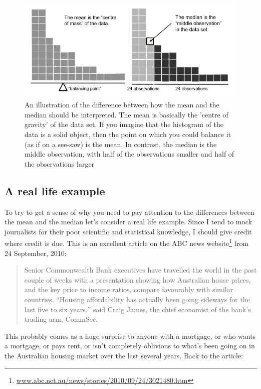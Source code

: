 \documentclass[
]{book}
\begin{document}
\begin{figure}
\includegraphics[width=0.9\linewidth]{images/Figure11} \caption{An illustration of the difference between how the mean and the median should be interpreted. The mean is basically the 'centre of gravity' of the data set. If you imagine that the histogram of the data is a solid object, then the point on which you could balance it (as if on a see-saw) is the mean. In contrast, the median is the middle observation, with half of the observations smaller and half of the observations larger}\label{fig:fig4-4}
\end{figure}

\hypertarget{a-real-life-example}{%
\subsection{A real life example}\label{a-real-life-example}}

To try to get a sense of why you need to pay attention to the differences between the mean and the median let's consider a real life example. Since I tend to mock journalists for their poor scientific and statistical knowledge, I should give credit where credit is due. This is an excellent article on the ABC news website\footnote{\url{www.abc.net.au/news/stories/2010/09/24/3021480.htm}} from 24 September, 2010:

\begin{quote}
Senior Commonwealth Bank executives have travelled the world in the past couple of weeks with a presentation showing how Australian house prices, and the key price to income ratios, compare favourably with similar countries. ``Housing affordability has actually been going sideways for the last five to six years,'' said Craig James, the chief economist of the bank's trading arm, CommSec.
\end{quote}

This probably comes as a huge surprise to anyone with a mortgage, or who wants a mortgage, or pays rent, or isn't completely oblivious to what's been going on in the Australian housing market over the last several years. Back to the article:
\end{document}
